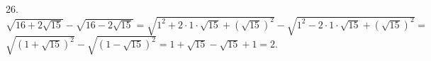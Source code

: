 26. $\sqrt{16+2\sqrt{15}}-\sqrt{16-2\sqrt{15}}=\sqrt{1^2+2\cdot1\cdot\sqrt{15}+(\sqrt{15})^2}-\sqrt{1^2-2\cdot1\cdot\sqrt{15}+(\sqrt{15})^2}=$\\$
\sqrt{(1+\sqrt{15})^2}-\sqrt{(1-\sqrt{15})^2}=1+\sqrt{15}-\sqrt{15}+1=2.$\\
